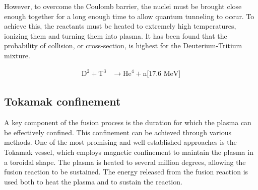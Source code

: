 \documentclass[11pt,a4paper,openany]{report}
\begin{document}
\begin{multicols}{2}
    However, to overcome the Coulomb barrier, the nuclei must be brought close enough together for a long enough time to allow quantum tunneling to occur. To achieve this, the reactants must be heated to extremely high temperatures, ionizing them and turning them into plasma. It has been found that the probability of collision, or cross-section, is highest for the Deuterium-Tritium mixture.

    \begin{align*}
        \text{D}^2 + \text{T}^3 & \rightarrow \text{He}^4 + \text{n[17.6 MeV]}
    \end{align*}
    \subsection{Tokamak confinement}
    A key component of the fusion process is the duration for which the plasma can be effectively confined. This confinement can be achieved through various methods. One of the most promising and well-established approaches is the Tokamak vessel, which employs magnetic confinement to maintain the plasma in a toroidal shape. The plasma is heated to several million degrees, allowing the fusion reaction to be sustained. The energy released from the fusion reaction is used both to heat the plasma and to sustain the reaction.


\end{multicols}
\end{document}
